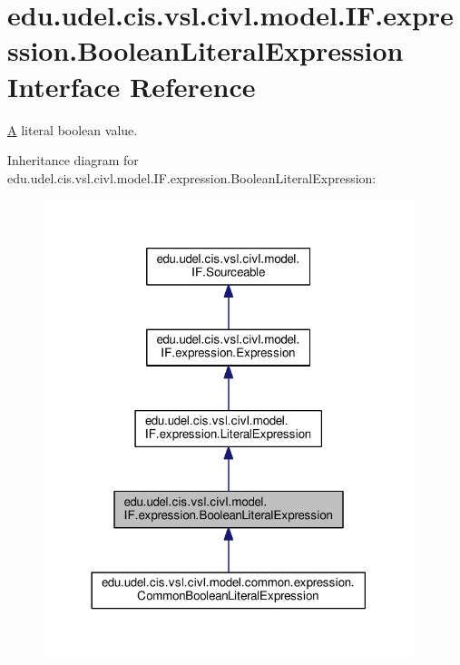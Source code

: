 \hypertarget{interfaceedu_1_1udel_1_1cis_1_1vsl_1_1civl_1_1model_1_1IF_1_1expression_1_1BooleanLiteralExpression}{}\section{edu.\+udel.\+cis.\+vsl.\+civl.\+model.\+I\+F.\+expression.\+Boolean\+Literal\+Expression Interface Reference}
\label{interfaceedu_1_1udel_1_1cis_1_1vsl_1_1civl_1_1model_1_1IF_1_1expression_1_1BooleanLiteralExpression}


\hyperlink{structA}{A} literal boolean value.  




Inheritance diagram for edu.\+udel.\+cis.\+vsl.\+civl.\+model.\+I\+F.\+expression.\+Boolean\+Literal\+Expression\+:
\nopagebreak
\begin{figure}[H]
\begin{center}
\leavevmode
\includegraphics[width=306pt]{interfaceedu_1_1udel_1_1cis_1_1vsl_1_1civl_1_1model_1_1IF_1_1expression_1_1BooleanLiteralExpression__inherit__graph}
\end{center}
\end{figure}


